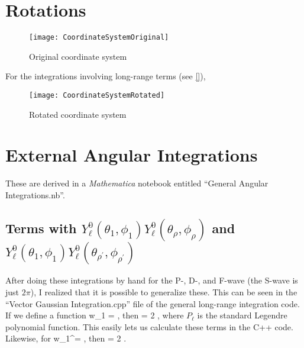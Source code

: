 \documentclass[Dissertation.tex]{subfiles}
\begin{document}
\section{Rotations}
\label{sec:Rotations}

\begin{figure}[H]
	\centering
	\texttt{[image: CoordinateSystemOriginal]}
	\caption{Original coordinate system}
	\label{fig:CoordinateSystemOriginal}
\end{figure}

For the integrations involving long-range terms (see \cref{}), 

\begin{figure}[H]
	\centering
	\texttt{[image: CoordinateSystemRotated]}
	\caption{Rotated coordinate system}
	\label{fig:CoordinateSystemRotated}
\end{figure}


\section{External Angular Integrations}
\label{sec:AngularInt}

These are derived in a \emph{Mathematica} notebook entitled ``General Angular Integrations.nb''.



\subsection{Terms with \texorpdfstring{$Y_\ell^0(\theta_1, \phi_1) Y_\ell^0(\theta_{\rho}, \phi_{\rho})$}{Y1-Yrho} and \texorpdfstring{$Y_\ell^0(\theta_1, \phi_1) Y_\ell^0(\theta_{\rho^\prime}, \phi_{\rho^\prime})$}{Y1-Yrho'}}
\label{sec:AngR1Rho}

After doing these integrations by hand for the P-, D-, and F-wave (the S-wave is just $2\pi$), I realized that it is possible to generalize these. This can be seen in the ``Vector Gaussian Integration.cpp'' file of the general long-range integration code. If we define a function
\beq
w_1 = ,
\eeq
then
\beq
{} = 2 \pi {},
\eeq
where $P_\ell$ is the standard Legendre polynomial function. This easily lets us calculate these terms in the C++ code. Likewise, for
\beq
w_1^\prime = ,
\eeq
then
\beq
{} = 2 \pi {}.
\eeq
\end{document}
